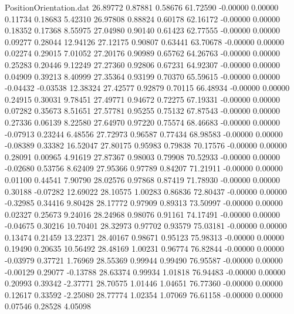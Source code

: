 \begin{filecontents}{PositionOrientation.dat}
  26.89772    0.87881    0.58676    61.72590   -0.00000    0.00000    0.11734    0.18683    5.42310
  26.97808    0.88824    0.60178    62.16172   -0.00000    0.00000    0.18352    0.17368    8.55975
  27.04980    0.90140    0.61423    62.77555   -0.00000    0.00000    0.09277    0.28044   12.94126
  27.12175    0.90807    0.63441    63.70678   -0.00000    0.00000    0.02274    0.29015    7.01052
  27.20176    0.90989    0.65762    64.26763   -0.00000    0.00000    0.25283    0.20446    9.12249
  27.27360    0.92806    0.67231    64.92307   -0.00000    0.00000    0.04909    0.39213    8.40999
  27.35364    0.93199    0.70370    65.59615   -0.00000    0.00000   -0.04432   -0.03538   12.38324
  27.42577    0.92879    0.70115    66.48934   -0.00000    0.00000    0.24915    0.30031    9.78451
  27.49771    0.94672    0.72275    67.19331   -0.00000    0.00000    0.07282    0.35673    8.51651
  27.57781    0.95255    0.75132    67.87543   -0.00000    0.00000    0.27336    0.06139    8.22580
  27.64970    0.97220    0.75574    68.46683   -0.00000    0.00000   -0.07913    0.23244    6.48556
  27.72973    0.96587    0.77434    68.98583   -0.00000    0.00000   -0.08389    0.33382   16.52047
  27.80175    0.95983    0.79838    70.17576   -0.00000    0.00000    0.28091    0.00965    4.91619
  27.87367    0.98003    0.79908    70.52933   -0.00000    0.00000   -0.02680    0.53756    8.62409
  27.95366    0.97789    0.84207    71.21911   -0.00000    0.00000    0.01100    0.44541    7.90790
  28.02576    0.97868    0.87419    71.78930   -0.00000    0.00000    0.30188   -0.07282   12.69022
  28.10575    1.00283    0.86836    72.80437   -0.00000    0.00000   -0.32985    0.34416    9.80428
  28.17772    0.97909    0.89313    73.50997   -0.00000    0.00000    0.02327    0.25673    9.24016
  28.24968    0.98076    0.91161    74.17491   -0.00000    0.00000   -0.04675    0.30216   10.70401
  28.32973    0.97702    0.93579    75.03181   -0.00000    0.00000    0.13474    0.21459   13.22371
  28.40167    0.98671    0.95123    75.98313   -0.00000    0.00000    0.19490    0.20635   10.56492
  28.48169    1.00231    0.96774    76.82844   -0.00000    0.00000   -0.03979    0.37721    1.76969
  28.55369    0.99944    0.99490    76.95587   -0.00000    0.00000   -0.00129    0.29077   -0.13788
  28.63374    0.99934    1.01818    76.94483   -0.00000    0.00000    0.20993    0.39342   -2.37771
  28.70575    1.01446    1.04651    76.77360   -0.00000    0.00000    0.12617    0.33592   -2.25080
  28.77774    1.02354    1.07069    76.61158   -0.00000    0.00000    0.07546    0.28528    4.05098

\end{filecontents}
